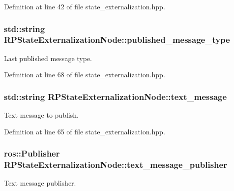 \-Definition at line 42 of file state\-\_\-externalization.\-hpp.

\hypertarget{class_r_p_state_externalization_node_a011fc67b3d66b4421136e33837674f6f}{
\subsubsection[{published\-\_\-message\-\_\-type}]{\setlength{\rightskip}{0pt plus 5cm}std\-::string {\bf \-R\-P\-State\-Externalization\-Node\-::published\-\_\-message\-\_\-type}}}\label{class_r_p_state_externalization_node_a011fc67b3d66b4421136e33837674f6f}
\-Last published message type. 

\-Definition at line 68 of file state\-\_\-externalization.\-hpp.

\hypertarget{class_r_p_state_externalization_node_a9d9c064277958b5f4027e62caf85079c}{
\subsubsection[{text\-\_\-message}]{\setlength{\rightskip}{0pt plus 5cm}std\-::string {\bf \-R\-P\-State\-Externalization\-Node\-::text\-\_\-message}}}\label{class_r_p_state_externalization_node_a9d9c064277958b5f4027e62caf85079c}
\-Text message to publish. 

\-Definition at line 65 of file state\-\_\-externalization.\-hpp.

\hypertarget{class_r_p_state_externalization_node_a7fb1584c32931b9d61d3f2f85a12ed8d}{
\subsubsection[{text\-\_\-message\-\_\-publisher}]{\setlength{\rightskip}{0pt plus 5cm}ros\-::\-Publisher {\bf \-R\-P\-State\-Externalization\-Node\-::text\-\_\-message\-\_\-publisher}}}\label{class_r_p_state_externalization_node_a7fb1584c32931b9d61d3f2f85a12ed8d}
\-Text message publisher. 

